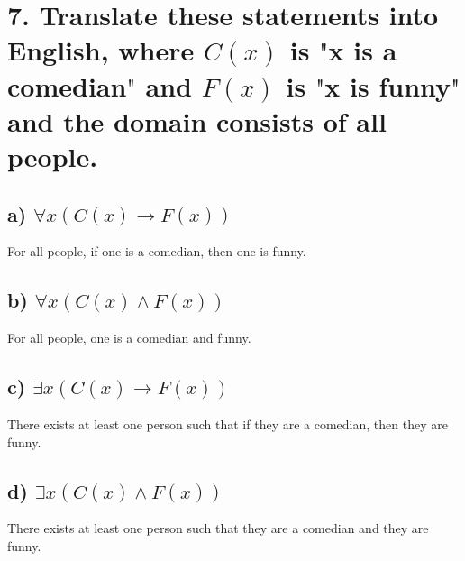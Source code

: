 \documentclass[11pt, oneside]{article} %
\numberwithin{equation}{section} %
\numberwithin{figure}{section} %
\begin{document}
\begin{table}[!htp]
\section{7. Translate these statements into English, where $C(x)$ is $\texttt{"}$x is a comedian$\texttt{"}$ and $F(x)$ is $\texttt{"}$x is funny$\texttt{"}$ and the domain consists of all people.}
\subsection{a) $\forall$$x(C(x) \rightarrow F(x))$}
For all people, if one is a comedian, then one is funny.
\subsection{b) $\forall$$x(C(x) \wedge F(x))$}
For all people, one is a comedian and funny.
\subsection{c) $\exists$$x(C(x) \rightarrow F(x))$}
There exists at least one person such that if they are a comedian, then they are funny.
\subsection{d) $\exists$$x(C(x) \wedge F(x))$}
There exists at least one person such that they are a comedian and they are funny.

\end{table}
\end{document}
